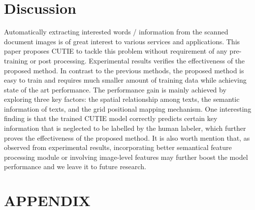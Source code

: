 \documentclass[10pt,twocolumn,letterpaper]{article}
\begin{document}
\section{Discussion}
Automatically extracting interested words / information from the scanned document images is of great interest to various services and applications. This paper proposes CUTIE to tackle this problem without requirement of any pre-training or post processing. Experimental results verifies the effectiveness of the proposed method. In contrast to the previous methods, the proposed method is easy to train and requires much smaller amount of training data while achieving state of the art performance. The performance gain is mainly achieved by exploring three key factors: the spatial relationship among texts, the semantic information of texts, and the grid positional mapping mechanism. One interesting finding is that the trained CUTIE model correctly predicts certain key information that is neglected to be labelled by the human labeler, which further proves the effectiveness of the proposed method. It is also worth mention that, as observed from experimental results, incorporating better semantical feature processing module or involving image-level features may further boost the model performance and we leave it to future research.

{\small


}

\section{APPENDIX}
\end{document}
